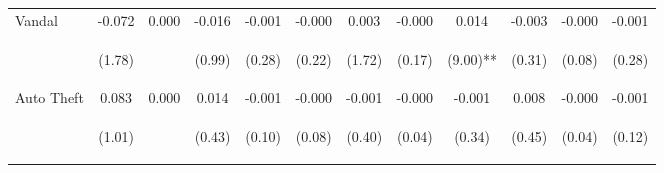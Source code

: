 \begin{tabular}{lccccccccccc}
\noalign{\smallskip}Vandal & -0.072 & 0.000 & -0.016 & -0.001 & -0.000 & 0.003 & -0.000 & 0.014 & -0.003 & -0.000 & -0.001\\
 & \begin{footnotesize}(1.78)\end{footnotesize} & \begin{footnotesize}\end{footnotesize} & \begin{footnotesize}(0.99)\end{footnotesize} & \begin{footnotesize}(0.28)\end{footnotesize} & \begin{footnotesize}(0.22)\end{footnotesize} & \begin{footnotesize}(1.72)\end{footnotesize} & \begin{footnotesize}(0.17)\end{footnotesize} & \begin{footnotesize}(9.00)**\end{footnotesize} & \begin{footnotesize}(0.31)\end{footnotesize} & \begin{footnotesize}(0.08)\end{footnotesize} & \begin{footnotesize}(0.28)\end{footnotesize}\\
\noalign{\smallskip}Auto Theft & 0.083 & 0.000 & 0.014 & -0.001 & -0.000 & -0.001 & -0.000 & -0.001 & 0.008 & -0.000 & -0.001\\
 & \begin{footnotesize}(1.01)\end{footnotesize} & \begin{footnotesize}\end{footnotesize} & \begin{footnotesize}(0.43)\end{footnotesize} & \begin{footnotesize}(0.10)\end{footnotesize} & \begin{footnotesize}(0.08)\end{footnotesize} & \begin{footnotesize}(0.40)\end{footnotesize} & \begin{footnotesize}(0.04)\end{footnotesize} & \begin{footnotesize}(0.34)\end{footnotesize} & \begin{footnotesize}(0.45)\end{footnotesize} & \begin{footnotesize}(0.04)\end{footnotesize} & \begin{footnotesize}(0.12)\end{footnotesize}\\

\end{tabular}
